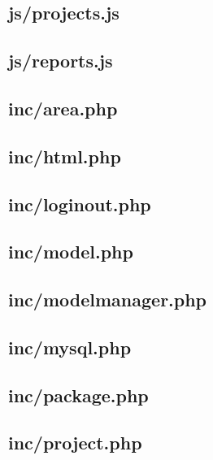 \documentclass[11pt,a4paper,spanish,twoside]{book}
\begin{document}
\subsection{js/projects.js}
%

\subsection{js/reports.js}
%

\subsection{inc/area.php}
%

\subsection{inc/html.php}
%

\subsection{inc/loginout.php}
%

\subsection{inc/model.php}
%

\subsection{inc/modelmanager.php}
%

\subsection{inc/mysql.php}
%

\subsection{inc/package.php}
%

\subsection{inc/project.php}
%
\end{document}
